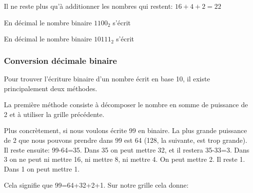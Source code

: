 Il ne reste plus qu'à additionner les nombres qui restent: $16 + 4 + 2=22$


\begin{myexamples}
	\item En décimal le nombre binaire $1100_{2}$ s'écrit
		  \vspace{1.5cm}
    \item En décimal le nombre binaire $10111_{2}$ s'écrit
    \vspace{1.5cm}
\end{myexamples}

\subsubsection{Conversion décimale binaire}

Pour trouver l'écriture binaire d'un nombre écrit en base 10, il existe principalement deux méthodes. 


\; 

La première méthode consiste à décomposer le nombre en somme de puissance de 2 et à utiliser la grille précédente. 

Plus concrètement, si nous voulons écrite 99 en binaire. La plus grande puissance de 2 que nous pouvons prendre dans 99 est 64 (128, la suivante, est trop grande). Il reste ensuite: 99-64=35. Dans 35 on peut mettre 32, et il restera 35-33=3. Dans 3 on ne peut ni mettre 16, ni mettre 8, ni mettre 4. On peut mettre 2. Il reste 1. Dans 1 on peut mettre 1. 

Cela signifie que 99=64+32+2+1. Sur notre grille cela donne:

\begin{center}
\end{center}

